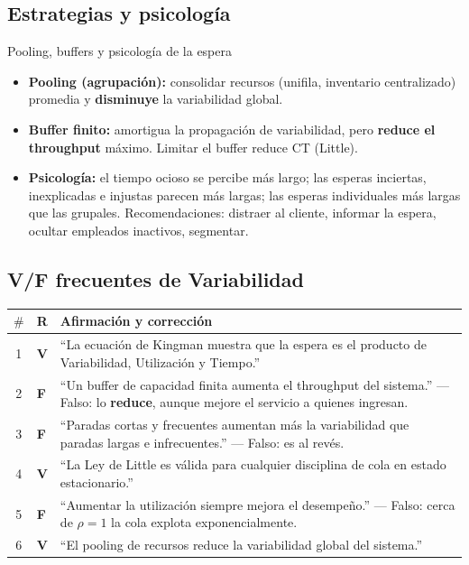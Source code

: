 \subsection{Estrategias y psicología}

\begin{definicion}{Pooling, buffers y psicología de la espera}
\begin{itemize}[leftmargin=1.4em, itemsep=1pt]
  \item \textbf{Pooling (agrupación):} consolidar recursos (unifila, inventario centralizado) promedia y \textbf{disminuye} la variabilidad global.
  \item \textbf{Buffer finito:} amortigua la propagación de variabilidad, pero \textbf{reduce el throughput} máximo. Limitar el buffer reduce CT (Little).
  \item \textbf{Psicología:} el tiempo ocioso se percibe más largo; las esperas inciertas, inexplicadas e injustas parecen más largas; las esperas individuales más largas que las grupales. Recomendaciones: distraer al cliente, informar la espera, ocultar empleados inactivos, segmentar.
\end{itemize}
\end{definicion}

\subsection{V/F frecuentes de Variabilidad}

\begin{center}
\small
\begin{tabular}{@{}clp{10.5cm}@{}}
  \toprule
  $\#$ & R & Afirmación y corrección \\
  \midrule
  1 & \textbf{V} & ``La ecuación de Kingman muestra que la espera es el producto de Variabilidad, Utilización y Tiempo.'' \\
  2 & \textbf{F} & ``Un buffer de capacidad finita aumenta el throughput del sistema.'' --- Falso: lo \textbf{reduce}, aunque mejore el servicio a quienes ingresan. \\
  3 & \textbf{F} & ``Paradas cortas y frecuentes aumentan más la variabilidad que paradas largas e infrecuentes.'' --- Falso: es al revés. \\
  4 & \textbf{V} & ``La Ley de Little es válida para cualquier disciplina de cola en estado estacionario.'' \\
  5 & \textbf{F} & ``Aumentar la utilización siempre mejora el desempeño.'' --- Falso: cerca de $\rho=1$ la cola explota exponencialmente. \\
  6 & \textbf{V} & ``El pooling de recursos reduce la variabilidad global del sistema.'' \\
  \bottomrule
\end{tabular}
\end{center}



